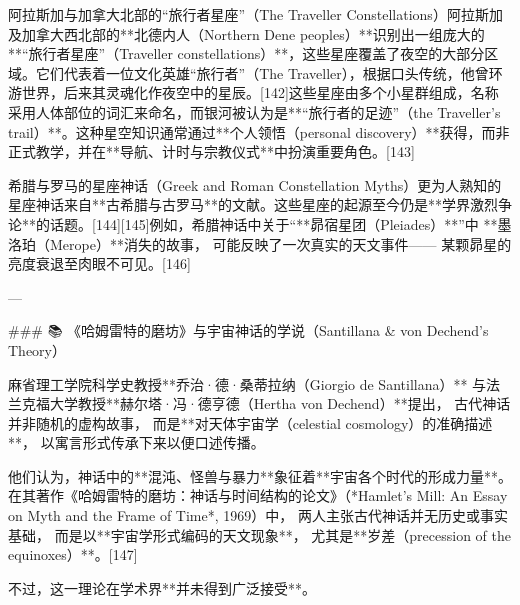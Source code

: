 阿拉斯加与加拿大北部的“旅行者星座”（The Traveller Constellations）阿拉斯加及加拿大西北部的**北德内人（Northern Dene peoples）**识别出一组庞大的**“旅行者星座”（Traveller constellations）**，这些星座覆盖了夜空的大部分区域。它们代表着一位文化英雄“旅行者”（The Traveller），根据口头传统，他曾环游世界，后来其灵魂化作夜空中的星辰。[142]这些星座由多个小星群组成，名称采用人体部位的词汇来命名，而银河被认为是**“旅行者的足迹”（the Traveller’s trail）**。这种星空知识通常通过**个人领悟（personal discovery）**获得，而非正式教学，并在**导航、计时与宗教仪式**中扮演重要角色。[143]

希腊与罗马的星座神话（Greek and Roman Constellation Myths）更为人熟知的星座神话来自**古希腊与古罗马**的文献。这些星座的起源至今仍是**学界激烈争论**的话题。[144][145]例如，希腊神话中关于“**昴宿星团（Pleiades）**”中
**墨洛珀（Merope）**消失的故事，
可能反映了一次真实的天文事件——
某颗昴星的亮度衰退至肉眼不可见。[146]

---

### 📚 《哈姆雷特的磨坊》与宇宙神话的学说（Santillana & von Dechend’s Theory）

麻省理工学院科学史教授**乔治·德·桑蒂拉纳（Giorgio de Santillana）**
与法兰克福大学教授**赫尔塔·冯·德亨德（Hertha von Dechend）**提出，
古代神话并非随机的虚构故事，
而是**对天体宇宙学（celestial cosmology）的准确描述**，
以寓言形式传承下来以便口述传播。

他们认为，神话中的**混沌、怪兽与暴力**象征着**宇宙各个时代的形成力量**。
在其著作《哈姆雷特的磨坊：神话与时间结构的论文》（*Hamlet’s Mill: An Essay on Myth and the Frame of Time*, 1969）中，
两人主张古代神话并无历史或事实基础，
而是以**宇宙学形式编码的天文现象**，
尤其是**岁差（precession of the equinoxes）**。[147]

不过，这一理论在学术界**并未得到广泛接受**。
